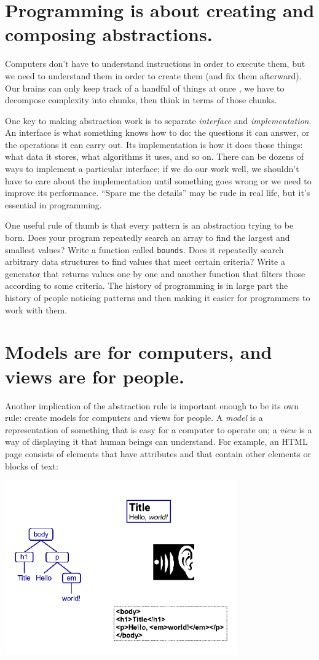 \documentclass[10pt,letterpaper]{article}
\newcommand{\rulemajor}[1]{\section{#1}}
\begin{document}
\rulemajor{Programming is about creating and composing abstractions.}

Computers don't have to understand instructions in order to execute them, but we
need to understand them in order to create them (and fix them afterward).  Our
brains can only keep track of a handful of things at once \cite{Mill1956}, we
have to decompose complexity into chunks, then think in terms of those chunks.

One key to making abstraction work is to separate \emph{interface} and
\emph{implementation}.  An interface is what something knows how to do: the
questions it can answer, or the operations it can carry out. Its implementation
is how it does those things: what data it stores, what algorithms it uses, and
so on.  There can be dozens of ways to implement a particular interface; if we
do our work well, we shouldn't have to care about the implementation until
something goes wrong or we need to improve its performance.  ``Spare me the
details'' may be rude in real life, but it's essential in programming.

One useful rule of thumb is that every pattern is an abstraction trying to be
born.  Does your program repeatedly search an array to find the largest and
smallest values?  Write a function called \texttt{bounds}.  Does it repeatedly
search arbitrary data structures to find values that meet certain criteria?
Write a generator that returns values one by one and another function that
filters those according to some criteria.  The history of programming is in
large part the history of people noticing patterns and then making it easier
for programmers to work with them.

\rulemajor{Models are for computers, and views are for people.}

Another implication of the abstraction rule is important enough to be its own
rule: create models for computers and views for people.  A \emph{model} is a
representation of something that is easy for a computer to operate on; a
\emph{view} is a way of displaying it that human beings can understand.  For
example, an HTML page consists of elements that have attributes and that contain
other elements or blocks of text:

\includegraphics[width=10.0cm]{modelview.png}
\end{document}
